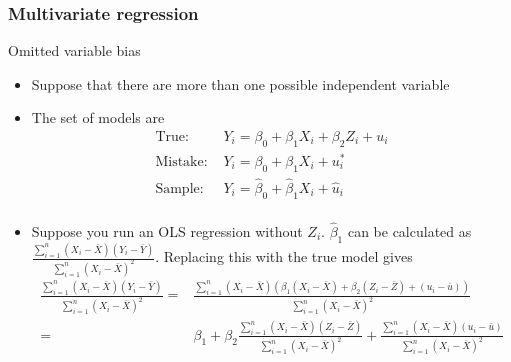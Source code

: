 \documentclass[compress]{beamer}
\begin{document}
\begin{frame}
\frametitle{Multivariate regression}
Omitted variable bias
\begin{itemize}
\item Suppose that there are more than one possible independent variable
\item The set of models are
\[
\begin{aligned}
\text{True: }& Y_i = \beta_0 + \beta_1 X_i + \beta_2 Z_i+u_i\\
\text{Mistake: }& Y_i = \beta_0 + \beta_1 X_i + u_i^*\\
\text{Sample: }& Y_i = \hat{\beta}_0 + \hat{\beta}_1 X_i+ \hat{u}_i\\
\end{aligned}
\]
\item Suppose you run an OLS regression without $Z_i$.  $\hat{\beta}_1$ can be calculated as $\frac{\sum_{i=1}^n(X_i-\bar{X})(Y_i-\bar{Y})}{\sum_{i=1}^n(X_i-\bar{X})^2}$. Replacing this with the true model gives
\footnotesize{\[
\begin{aligned}
\frac{\sum_{i=1}^n(X_i-\bar{X})(Y_i-\bar{Y})}{\sum_{i=1}^n(X_i-\bar{X})^2} =& \frac{\sum_{i=1}^n(X_i-\bar{X})(\beta_1(X_i-\bar{X})+\beta_2(Z_i-\bar{Z})+(u_i-\bar{u}))}{\sum_{i=1}^n(X_i-\bar{X})^2}\\
=& \beta_1 + \beta_2\frac{\sum_{i=1}^n(X_i-\bar{X})(Z_i-\bar{Z})}{\sum_{i=1}^n(X_i-\bar{X})^2}+\frac{\sum_{i=1}^n(X_i-\bar{X})(u_i-\bar{u})}{\sum_{i=1}^n(X_i-\bar{X})^2}\\
\end{aligned}
\]}\normalsize
\end{itemize}
\end{frame}
\end{document}
